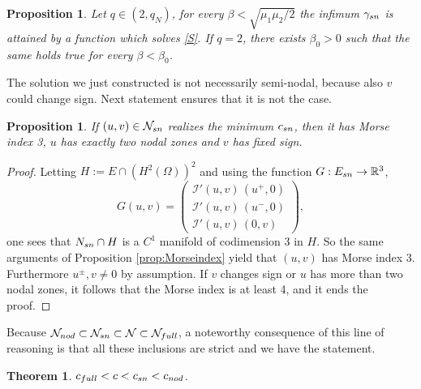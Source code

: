 \documentclass[10pt,a4paper]{amsart}
\numberwithin{equation}{section}
\newtheorem{theorem}[theo]{Theorem}
\newtheorem{proposition}[theo]{Proposition}
\begin{document}
\begin{proposition}\label{prop:seminodal1}
Let $q\in (2,q_N)$, for every $\beta < \sqrt{\mu_1\mu_2/2}$ the infimum $\gamma_{\rm sn}$
is attained by a function which solves \eqref{S}.
If $q=2$, there exists $\beta_0>0$ such that the same holds true for every
$\beta<\beta_0$.
\end{proposition}

The solution we  just constructed is not necessarily semi-nodal, because also $v$
could change sign. Next statement ensures that it is not the case.

\begin{proposition}\label{prop:seminodal2}
If $(u,v)\in \mathcal N_{\rm sn}$ realizes the minimum $c_{\rm sn}$, then it has
Morse index 3, $u$ has exactly two nodal zones and  $v$ has fixed sign.
\end{proposition}

\begin{proof}
Letting  $H:=E\cap \left(H^2(\Omega)\right)^2$ and using the function
$G:E_{\rm sn}\to\mathbb{R}^3$,
\[
G(u,v)=\begin{pmatrix}
\mathcal I'(u,v) \, (u^+,0) \\ \mathcal I'(u,v) \, (u^-,0) \\
\mathcal I'(u,v) \, (0,v)
 \end{pmatrix},
\]
one sees that $N_{\rm sn}\cap H$ is a $C^1$ manifold of codimension 3 in $H$.
So the same arguments of Proposition \ref{prop:Morseindex} yield that $(u,v)$
has Morse index 3.
Furthermore $u^{\pm} , v\neq 0$ by assumption. If $v$ changes sign or $u$ has more
than two nodal zones, it follows that the Morse index is at least 4, and it ends
the proof.
\end{proof}

Because $\mathcal N_{\rm nod} \subset \mathcal N_{\rm sn} \subset \mathcal N\subset
\mathcal N_{\rm full}$, a noteworthy consequence of this line of reasoning  is that
 all these inclusions are strict and we have the statement.

\begin{theorem}
$c_{\rm full} < c <c_{\rm sn} < c_{\rm nod}$.
\end{theorem}
\end{document}
